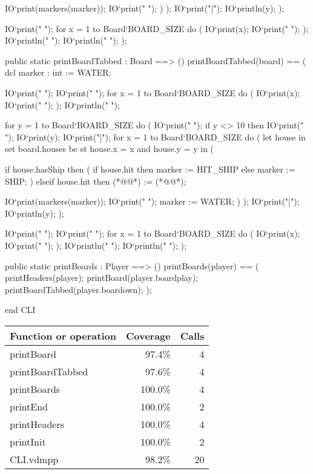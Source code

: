 \begin{vdm_al}
       IO`print(markers(marker));
       IO`print(" ");
      )
     );
     IO`print("|");
     IO`println(y);
    );
 
    IO`print("   ");
    for x = 1 to Board`BOARD_SIZE do (
     IO`print(x); 
     IO`print(" ");
    );
    IO`println(" ");
    IO`println(" ");
   );
  
 
  public static printBoardTabbed : Board ==> ()
   printBoardTabbed(board) == (
    dcl marker : int := WATER;
   
    IO`print("   ");
    IO`print("           ");
    for x = 1 to Board`BOARD_SIZE do (
     IO`print(x); 
     IO`print(" ");
    );
    IO`println(" ");
    
    for y = 1 to Board`BOARD_SIZE do (
     IO`print("           ");
     if y <> 10 then IO`print(" ");
     IO`print(y);
     IO`print("|");
     for x = 1 to Board`BOARD_SIZE do (
      let house in set board.houses be st house.x = x and house.y = y in (
      
       if house.hasShip then (
        if house.hit then
         marker := HIT_SHIP
        else
         marker := SHIP;
       )
       elseif house.hit then (*@@*) := (*@@*);

       IO`print(markers(marker));
       IO`print(" ");
       marker := WATER;
      )
     );
     IO`print("|");
     IO`println(y);
    );
 
    IO`print("   ");
    IO`print("           ");
    for x = 1 to Board`BOARD_SIZE do (
     IO`print(x); 
     IO`print(" ");
    );
    IO`println(" ");
    IO`println(" ");
   );
  
  public static printBoards : Player ==> ()
   printBoards(player) == (
    printHeaders(player);
    printBoard(player.boardplay);
    printBoardTabbed(player.boardown);
   );
  
end CLI
\end{vdm_al}
\bigskip
\begin{longtable}{|l|r|r|}
\hline
Function or operation & Coverage & Calls \\
\hline
\hline
printBoard & 97.4\% & 4 \\
\hline
printBoardTabbed & 97.6\% & 4 \\
\hline
printBoards & 100.0\% & 4 \\
\hline
printEnd & 100.0\% & 2 \\
\hline
printHeaders & 100.0\% & 4 \\
\hline
printInit & 100.0\% & 2 \\
\hline
\hline
CLI.vdmpp & 98.2\% & 20 \\
\hline
\end{longtable}

